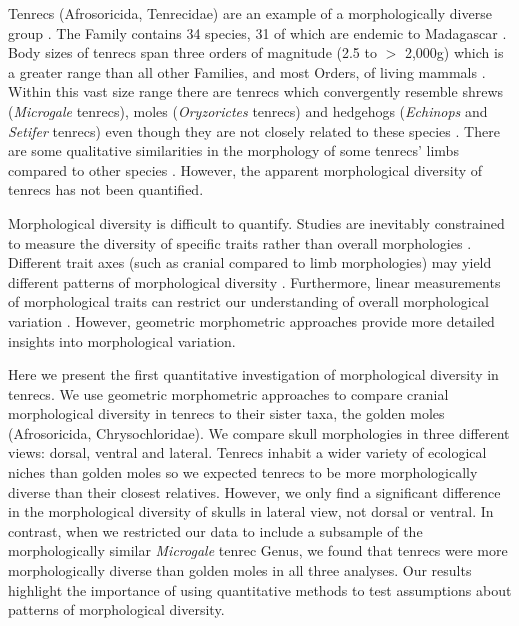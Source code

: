 \documentclass[12pt,a4paper]{article}
\begin{document}

	Tenrecs (Afrosoricida, Tenrecidae) are an example of a morphologically diverse group \citep{Soarimalala2011, Olson2003}. The Family contains 34 species, 31 of which are endemic to Madagascar \citep{Olson2013}. Body sizes of tenrecs span three orders of magnitude (2.5 to $>$ 2,000g) which is a greater range than all other Families, and most Orders, of living mammals \citep{Olson2003}. Within this vast size range there are tenrecs which convergently resemble shrews (\textit{Microgale} tenrecs), moles (\textit{Oryzorictes} tenrecs) and hedgehogs (\textit{Echinops} and \textit{Setifer} tenrecs) \citep{Eisenberg1969} even though they are not closely related to these species \citep{Stanhope1998}. There are some qualitative similarities in the morphology of some tenrecs' limbs compared to other species \citep{Salton2009}. However, the apparent morphological diversity of tenrecs has not been quantified.


	Morphological diversity is difficult to quantify. Studies are inevitably constrained to measure the diversity of specific traits rather than overall morphologies \citep{Roy1997}. Different trait axes (such as cranial compared to limb morphologies) may yield different patterns of morphological diversity \citep{Foth2012}.
	Furthermore, linear measurements of morphological traits can restrict our understanding of overall morphological variation \citep{Rohlf1993}. However, geometric morphometric approaches \citep{Rohlf1993, Adams2013} provide more detailed insights into morphological variation.
	 
	Here we present the first quantitative investigation of morphological diversity in tenrecs. We use geometric morphometric approaches to compare cranial morphological diversity in tenrecs to their sister taxa, the golden moles (Afrosoricida, Chrysochloridae). We compare skull morphologies in three different views: dorsal, ventral and lateral. 
	Tenrecs inhabit a wider variety of ecological niches \citep{Soarimalala2011} than golden moles \citep{Bronner1995} so we expected tenrecs to be more morphologically diverse than their closest relatives. However, we only find a significant difference in the morphological diversity of skulls in lateral view, not dorsal or ventral. In contrast, when we restricted our data to include a subsample of the morphologically similar \textit{Microgale} tenrec Genus, we found that tenrecs were more morphologically diverse than golden moles in all three analyses.
	Our results highlight the importance of using quantitative methods to test assumptions about patterns of morphological diversity.
\end{document}
